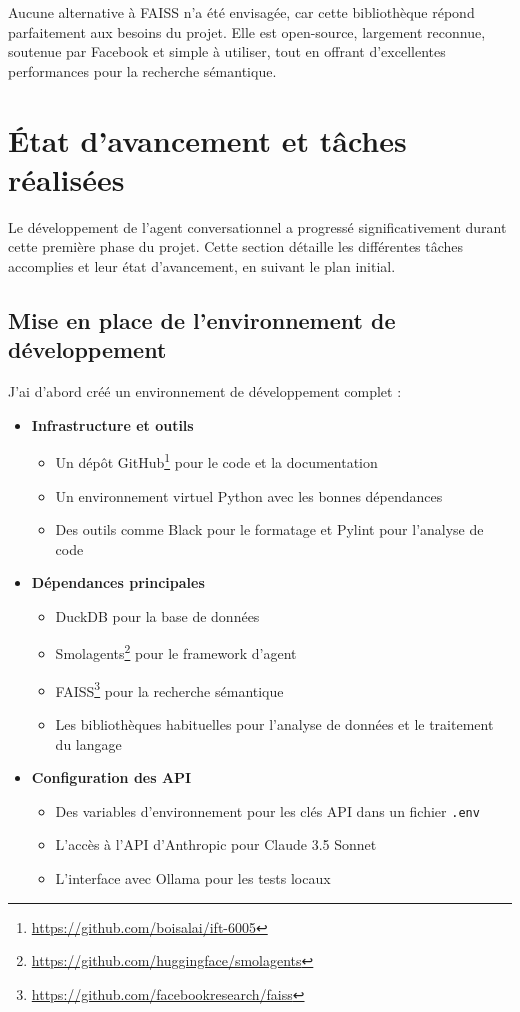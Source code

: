 \documentclass[a4paper,11pt]{article}
\begin{document}
Aucune alternative à FAISS n’a été envisagée, car cette bibliothèque répond parfaitement aux besoins du projet. Elle est open-source, largement reconnue, soutenue par Facebook et simple à utiliser, tout en offrant d’excellentes performances pour la recherche sémantique.


\newpage
\section{État d'avancement et tâches réalisées}
\label{sec:progress}

Le développement de l'agent conversationnel a progressé significativement durant cette
première phase du projet. Cette section détaille les différentes tâches accomplies
et leur état d'avancement, en suivant le plan initial.

\subsection{Mise en place de l'environnement de développement}

J'ai d'abord créé un environnement de développement complet :

\begin{itemize}
    \item \textbf{Infrastructure et outils}
    \begin{itemize}
        \item Un dépôt GitHub\footnote{\url{https://github.com/boisalai/ift-6005}} pour le code et la documentation
        \item Un environnement virtuel Python avec les bonnes dépendances
        \item Des outils comme Black pour le formatage et Pylint pour l'analyse de code
    \end{itemize}
    \item \textbf{Dépendances principales}
    \begin{itemize}
        \item DuckDB pour la base de données
        \item Smolagents\footnote{\url{https://github.com/huggingface/smolagents}} pour le framework d'agent
        \item FAISS\footnote{\url{https://github.com/facebookresearch/faiss}} pour la recherche sémantique
        \item Les bibliothèques habituelles pour l'analyse de données et le traitement du langage
    \end{itemize}
    \item \textbf{Configuration des API}
    \begin{itemize}
        \item Des variables d'environnement pour les clés API dans un fichier \texttt{.env}
        \item L'accès à l'API d'Anthropic pour Claude 3.5 Sonnet
        \item L'interface avec Ollama pour les tests locaux
    \end{itemize}
\end{itemize}
\end{document}
